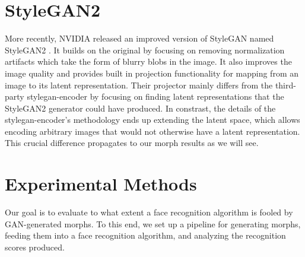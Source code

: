 \documentclass[12pt]{article}
\begin{document}
\section{StyleGAN2}
\par
More recently, NVIDIA released an improved version of StyleGAN named StyleGAN2 \cite{stylegan2}. It builds on the original by focusing on removing normalization artifacts which take the form of blurry blobs in the image. It also improves the image quality and provides built in projection functionality for mapping from an image to its latent representation. Their projector mainly differs from the third-party stylegan-encoder by focusing on finding latent representations that the StyleGAN2 generator could have produced. In constrast, the details of the stylegan-encoder's methodology ends up extending the latent space, which allows encoding arbitrary images that would not otherwise have a latent representation. This crucial difference propagates to our morph results as we will see.

\section{Experimental Methods}
\par
Our goal is to evaluate to what extent a face recognition algorithm is fooled by GAN-generated morphs. To this end, we set up a pipeline for generating morphs, feeding them into a face recognition algorithm, and analyzing the recognition scores produced.
\end{document}
